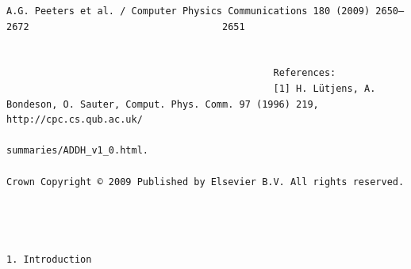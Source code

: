 \documentclass[a4paper]{article}
\newcommand{\gkwpagefont}{\fontsize{6.0pt}{7.55pt}\selectfont}
\begin{document}
\newpage
\begin{Verbatim}[fontsize=\gkwpagefont]
                                            A.G. Peeters et al. / Computer Physics Communications 180 (2009) 2650–2672                                  2651


                                               References:
                                               [1] H. Lütjens, A. Bondeson, O. Sauter, Comput. Phys. Comm. 97 (1996) 219, http://cpc.cs.qub.ac.uk/
                                                 summaries/ADDH_v1_0.html.
                                                                                       Crown Copyright © 2009 Published by Elsevier B.V. All rights reserved.




1. Introduction


\end{Verbatim}
\end{document}
